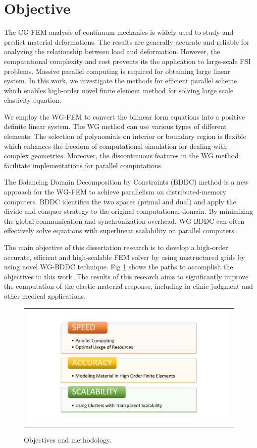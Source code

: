 \section{Objective}

The CG FEM analysis of continuum mechanics is widely used to study and predict material deformations. The results are generally accurate and reliable for analyzing the relationship between load and deformation. However, the computational complexity and cost prevents its the application to large-scale FSI problems. Massive parallel computing is required for obtaining large linear system. In this work, we investigate the methods for efficient parallel scheme which enables high-order novel finite element method for solving large scale elasticity equation.

We employ the WG-FEM to convert the bilinear form equations into a positive definite linear system. The WG method can use various types of different elements. The selection of polynomials on interior or boundary region is flexible which enhances the freedom of computational simulation for dealing with complex geometries. Moreover, the discontinuous features in the WG method facilitate implementations for parallel computations.

The Balancing Domain Decomposition by Constraints (BDDC) method is a new approach for the WG-FEM to achieve parallelism on distributed-memory computers. BDDC identifies the two spaces (primal and dual) and apply the divide and conquer strategy to the original computational domain. By minimizing the global communication and synchronization overhead,  WG-BDDC can often effectively solve equations with superlinear scalability on parallel computers.

The main objective of this dissertation research is to develop a high-order accurate, efficient and high-scalable FEM solver by using unstructured grids by using novel WG-BDDC technique. Fig \ref{fig: ch1p4} shows the paths to accomplish the objectives in this work. The results of this research aims to significantly improve the computation of the elastic material response, including in clinic judgment and other medical applications.

\begin{figure}[H]
	\centering
	\begin{tabular}{c}
		\includegraphics[width=1.0\textwidth]{./pics/ch1p4}
	\end{tabular}
	\caption{\footnotesize Objectives and methodology.} \label{fig: ch1p4}
\end{figure}

